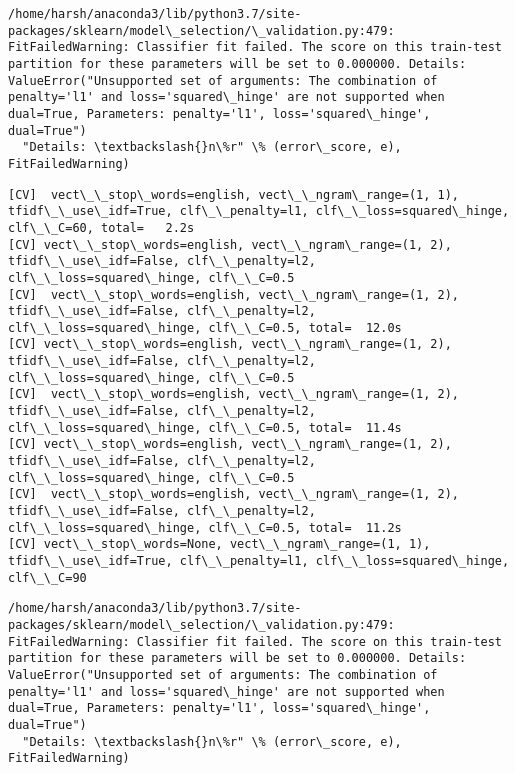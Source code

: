 \documentclass[11pt]{article}
\begin{document}
    \begin{Verbatim}[commandchars=\\\{\}]
/home/harsh/anaconda3/lib/python3.7/site-packages/sklearn/model\_selection/\_validation.py:479: FitFailedWarning: Classifier fit failed. The score on this train-test partition for these parameters will be set to 0.000000. Details: 
ValueError("Unsupported set of arguments: The combination of penalty='l1' and loss='squared\_hinge' are not supported when dual=True, Parameters: penalty='l1', loss='squared\_hinge', dual=True")
  "Details: \textbackslash{}n\%r" \% (error\_score, e), FitFailedWarning)

    \end{Verbatim}

    \begin{Verbatim}[commandchars=\\\{\}]
[CV]  vect\_\_stop\_words=english, vect\_\_ngram\_range=(1, 1), tfidf\_\_use\_idf=True, clf\_\_penalty=l1, clf\_\_loss=squared\_hinge, clf\_\_C=60, total=   2.2s
[CV] vect\_\_stop\_words=english, vect\_\_ngram\_range=(1, 2), tfidf\_\_use\_idf=False, clf\_\_penalty=l2, clf\_\_loss=squared\_hinge, clf\_\_C=0.5 
[CV]  vect\_\_stop\_words=english, vect\_\_ngram\_range=(1, 2), tfidf\_\_use\_idf=False, clf\_\_penalty=l2, clf\_\_loss=squared\_hinge, clf\_\_C=0.5, total=  12.0s
[CV] vect\_\_stop\_words=english, vect\_\_ngram\_range=(1, 2), tfidf\_\_use\_idf=False, clf\_\_penalty=l2, clf\_\_loss=squared\_hinge, clf\_\_C=0.5 
[CV]  vect\_\_stop\_words=english, vect\_\_ngram\_range=(1, 2), tfidf\_\_use\_idf=False, clf\_\_penalty=l2, clf\_\_loss=squared\_hinge, clf\_\_C=0.5, total=  11.4s
[CV] vect\_\_stop\_words=english, vect\_\_ngram\_range=(1, 2), tfidf\_\_use\_idf=False, clf\_\_penalty=l2, clf\_\_loss=squared\_hinge, clf\_\_C=0.5 
[CV]  vect\_\_stop\_words=english, vect\_\_ngram\_range=(1, 2), tfidf\_\_use\_idf=False, clf\_\_penalty=l2, clf\_\_loss=squared\_hinge, clf\_\_C=0.5, total=  11.2s
[CV] vect\_\_stop\_words=None, vect\_\_ngram\_range=(1, 1), tfidf\_\_use\_idf=True, clf\_\_penalty=l1, clf\_\_loss=squared\_hinge, clf\_\_C=90 

    \end{Verbatim}

    \begin{Verbatim}[commandchars=\\\{\}]
/home/harsh/anaconda3/lib/python3.7/site-packages/sklearn/model\_selection/\_validation.py:479: FitFailedWarning: Classifier fit failed. The score on this train-test partition for these parameters will be set to 0.000000. Details: 
ValueError("Unsupported set of arguments: The combination of penalty='l1' and loss='squared\_hinge' are not supported when dual=True, Parameters: penalty='l1', loss='squared\_hinge', dual=True")
  "Details: \textbackslash{}n\%r" \% (error\_score, e), FitFailedWarning)

    \end{Verbatim}
\end{document}
